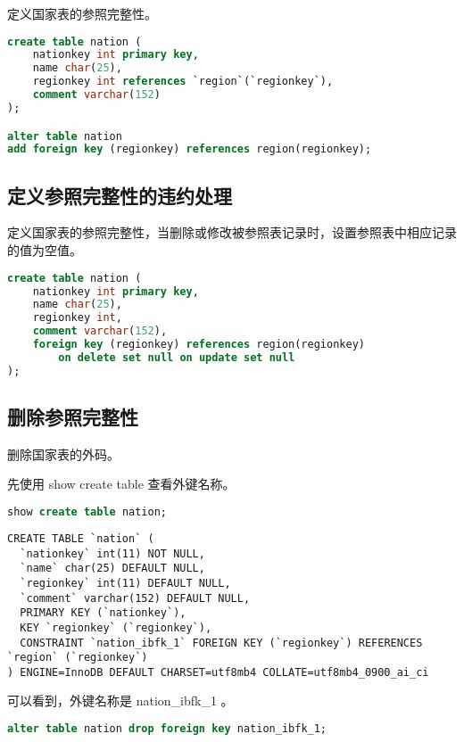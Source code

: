 \documentclass{article}
\begin{document}
定义国家表的参照完整性。

\begin{lstlisting}[language=sql]
create table nation (
	nationkey int primary key,
    name char(25),
    regionkey int references `region`(`regionkey`),
    comment varchar(152)
);

alter table nation 
add foreign key (regionkey) references region(regionkey);
\end{lstlisting}

\subsection{定义参照完整性的违约处理}

定义国家表的参照完整性，当删除或修改被参照表记录时，设置参照表中相应记录的值为空值。

\begin{lstlisting}[language=sql]
create table nation (
	nationkey int primary key,
    name char(25),
    regionkey int,
    comment varchar(152),
    foreign key (regionkey) references region(regionkey)
		on delete set null on update set null
);
\end{lstlisting}

\subsection{删除参照完整性}

删除国家表的外码。

先使用 show create table 查看外键名称。

\begin{lstlisting}[language=sql]
show create table nation;
\end{lstlisting}

\begin{lstlisting}
CREATE TABLE `nation` (
  `nationkey` int(11) NOT NULL,
  `name` char(25) DEFAULT NULL,
  `regionkey` int(11) DEFAULT NULL,
  `comment` varchar(152) DEFAULT NULL,
  PRIMARY KEY (`nationkey`),
  KEY `regionkey` (`regionkey`),
  CONSTRAINT `nation_ibfk_1` FOREIGN KEY (`regionkey`) REFERENCES `region` (`regionkey`)
) ENGINE=InnoDB DEFAULT CHARSET=utf8mb4 COLLATE=utf8mb4_0900_ai_ci
\end{lstlisting}

可以看到，外键名称是 nation\_ibfk\_1 。

\begin{lstlisting}[language=sql]
alter table nation drop foreign key nation_ibfk_1;
\end{lstlisting}
\end{document}
